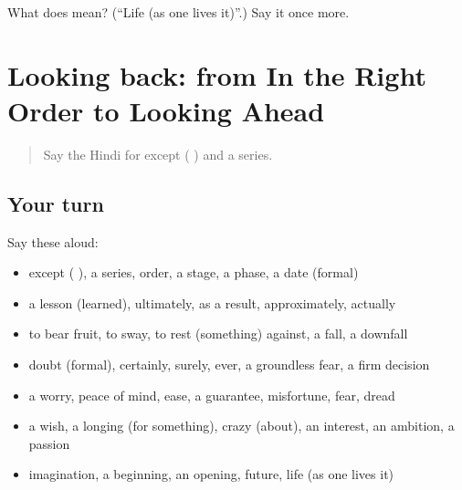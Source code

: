 \begin{tcolorbox}[breakable,colback=teal!4,colframe=teal!35!black,title={Before you move on}]
What does  mean? (\textquotedblleft{}Life (as one lives it)\textquotedblright{}.) Say it once more.
\end{tcolorbox}
\section[(dialogue)]{Looking back: from In the Right Order to Looking Ahead}

\label{lesson:HI-R559-review-553-559}



\begin{quote}
Say the Hindi for except ( ) and a series.
\end{quote}

\subsection*{Your turn}
Say these aloud:

\begin{itemize}
\raggedright
  \item except ( ), a series, order, a stage, a phase, a date (formal)
  \item a lesson (learned), ultimately, as a result, approximately, actually
  \item to bear fruit, to sway, to rest (something) against, a fall, a downfall
  \item doubt (formal), certainly, surely, ever, a groundless fear, a firm decision
  \item a worry, peace of mind, ease, a guarantee, misfortune, fear, dread
  \item a wish, a longing (for something), crazy (about), an interest, an ambition, a passion
  \item imagination, a beginning, an opening, future, life (as one lives it)
\end{itemize}

